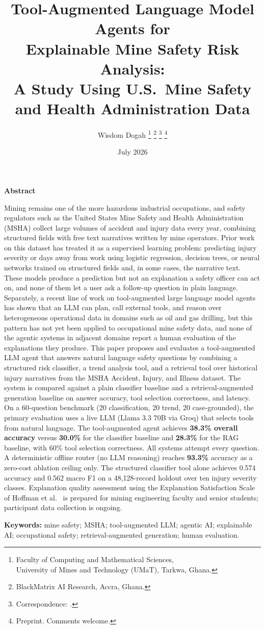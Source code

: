 \documentclass[11pt,a4paper]{article}
\title{%
  \textbf{Tool-Augmented Language Model Agents for}\\[0.35em]
  \textbf{Explainable Mine Safety Risk Analysis:}\\[0.35em]
  \textbf{A Study Using U.S.\ Mine Safety and Health Administration Data}%
}
\author{%
  Wisdom Dogah%
  \thanks{\footnotesize Faculty of Computing and Mathematical Sciences,\\ University of Mines and Technology (UMaT), Tarkwa, Ghana.}%
  \thanks{\footnotesize BlackMatrix AI Research, Accra, Ghana.}%
  \thanks{\footnotesize Correspondence: \email{wisdom@blackmatrix.io}.}%
  \thanks{\footnotesize Preprint. Comments welcome.}%
}
\date{July 2026}
\renewcommand{\abstractname}{Abstract}
\renewenvironment{abstract}{%
  \centerline{\textbf{\abstractname}}\par\vspace{0.5em}%
  \small\justifying
}{%
  \par\vspace{0.6em}%
}
\begin{document}
\maketitle
\thispagestyle{plain}
\justifying

\begin{abstract}
Mining remains one of the more hazardous industrial occupations, and
safety regulators such as the United States Mine Safety and Health
Administration (MSHA) collect large volumes of accident and injury
data every year, combining structured fields with free text narratives
written by mine operators. Prior work on this dataset has treated it as
a supervised learning problem: predicting injury severity or days away
from work using logistic regression, decision trees, or neural networks
trained on structured fields and, in some cases, the narrative text.
These models produce a prediction but not an explanation a safety
officer can act on, and none of them let a user ask a follow-up question
in plain language. Separately, a recent line of work on tool-augmented
large language model agents has shown that an LLM can plan, call
external tools, and reason over heterogeneous operational data in
domains such as oil and gas drilling, but this pattern has not yet been
applied to occupational mine safety data, and none of the agentic systems
in adjacent domains report a human evaluation of the explanations they
produce. This paper proposes and evaluates a tool-augmented LLM agent
that answers natural language safety questions by combining a structured
risk classifier, a trend analysis tool, and a retrieval tool over
historical injury narratives from the MSHA Accident, Injury, and Illness
dataset. The system is compared against a plain classifier baseline and
a retrieval-augmented generation baseline on answer accuracy, tool
selection correctness, and latency. On a 60-question benchmark (20
classification, 20 trend, 20 case-grounded), the primary evaluation uses a
live LLM (Llama 3.3 70B via Groq) that selects tools from natural language.
The tool-augmented agent achieves \textbf{38.3\% overall accuracy} versus
\textbf{30.0\%} for the classifier baseline and \textbf{28.3\%} for the RAG
baseline, with 60\% tool selection correctness. All systems attempt every
question. A deterministic offline router (no LLM reasoning) reaches
\textbf{93.3\%} accuracy as a zero-cost ablation ceiling only.
The structured classifier tool alone achieves 0.574 accuracy and 0.562
macro F1 on a 48{,}128-record holdout over ten injury severity classes.
Explanation quality assessment using the Explanation Satisfaction Scale
of Hoffman et al.~\cite{Hoffman2023} is prepared for mining
engineering faculty and senior students; participant data collection
is ongoing.

\noindent\textbf{Keywords:}
mine safety;
MSHA;
tool-augmented LLM;
agentic AI;
explainable AI;
occupational safety;
retrieval-augmented generation;
human evaluation.
\end{abstract}
\end{document}
